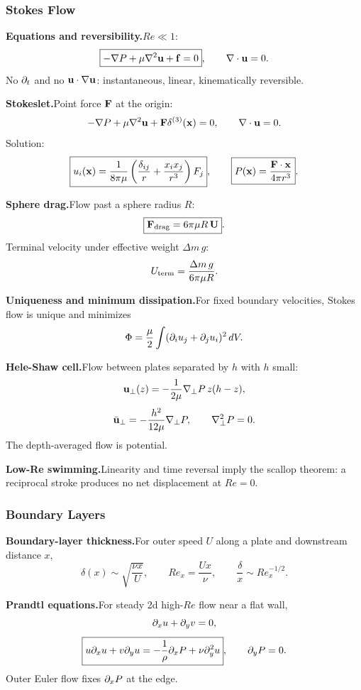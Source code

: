 \subsubsection*{Stokes Flow}

\noindent\textbf{Equations and reversibility.}\quad $Re\ll1$:
\[
  \boxed{-\nabla P+\mu\nabla^2\mathbf{u}+\mathbf{f}=0},
  \qquad
  \nabla\cdot\mathbf{u}=0.
\]
No $\partial_t$ and no $\mathbf{u}\cdot\nabla\mathbf{u}$: instantaneous, linear, kinematically reversible.

\noindent\textbf{Stokeslet.}\quad Point force $\mathbf{F}$ at the origin:
\[
  -\nabla P+\mu\nabla^2\mathbf{u}+\mathbf{F}\delta^{(3)}(\mathbf{x})=0,
  \qquad
  \nabla\cdot\mathbf{u}=0.
\]
Solution:
\[
  \boxed{u_i(\mathbf{x})=\frac{1}{8\pi\mu}
  \left(\frac{\delta_{ij}}{r}+\frac{x_ix_j}{r^3}\right)F_j},
  \qquad
  \boxed{P(\mathbf{x})=\frac{\mathbf{F}\cdot\mathbf{x}}{4\pi r^3}}.
\]

\noindent\textbf{Sphere drag.}\quad Flow past a sphere radius $R$:
\[
  \boxed{\mathbf{F}_{\rm drag}=6\pi\mu R\,\mathbf{U}}.
\]
Terminal velocity under effective weight $\Delta m\,g$:
\[
  U_{\rm term}=\frac{\Delta m\,g}{6\pi\mu R}.
\]

\noindent\textbf{Uniqueness and minimum dissipation.}\quad For fixed boundary velocities, Stokes flow is unique and minimizes
\[
  \Phi=\frac{\mu}{2}\int(\partial_i u_j+\partial_j u_i)^2\,dV.
\]

\noindent\textbf{Hele-Shaw cell.}\quad Flow between plates separated by $h$ with $h$ small:
\[
  \mathbf{u}_\perp(z)=-\frac{1}{2\mu}\nabla_\perp P\,z(h-z),
\]
\[
  \bar{\mathbf{u}}_\perp=-\frac{h^2}{12\mu}\nabla_\perp P,
  \qquad
  \nabla_\perp^2P=0.
\]
The depth-averaged flow is potential.

\noindent\textbf{Low-Re swimming.}\quad Linearity and time reversal imply the scallop theorem: a reciprocal stroke produces no net displacement at $Re=0$.

\subsubsection*{Boundary Layers}

\noindent\textbf{Boundary-layer thickness.}\quad For outer speed $U$ along a plate and downstream distance $x$,
\[
  \delta(x)\sim\sqrt{\frac{\nu x}{U}},
  \qquad
  Re_x=\frac{Ux}{\nu},
  \qquad
  \frac{\delta}{x}\sim Re_x^{-1/2}.
\]

\noindent\textbf{Prandtl equations.}\quad For steady 2d high-$Re$ flow near a flat wall,
\[
  \partial_xu+\partial_yv=0,
\]
\[
  \boxed{u\partial_xu+v\partial_yu=-\frac1\rho\partial_xP+\nu\partial_y^2u},
  \qquad
  \partial_yP=0.
\]
Outer Euler flow fixes $\partial_xP$ at the edge.

